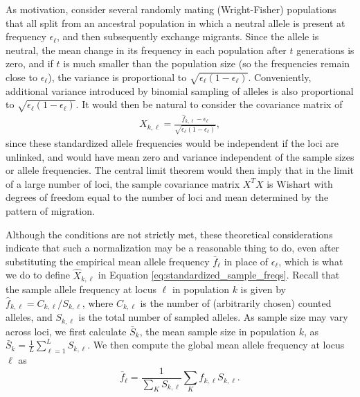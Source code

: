 \documentclass[10pt,letterpaper]{article}
\begin{document}
As motivation, consider several randomly mating (Wright-Fisher) populations
that all split from an ancestral population
in which a neutral allele is present at frequency $\epsilon_\ell$,
and then subsequently exchange migrants.
Since the allele is neutral, the mean change in its frequency in each population after $t$ generations is zero,
and if $t$ is much smaller than the population size (so the frequencies remain close to $\epsilon_\ell$), 
the variance is proportional to $\sqrt{\epsilon_\ell (1-\epsilon_\ell)}$.
Conveniently, additional variance introduced by binomial sampling of alleles
is also proportional to $\sqrt{\epsilon_\ell (1-\epsilon_\ell)}$.
It would then be natural to consider the covariance matrix of 
\begin{align}
  X_{k,\ell} = \frac{ \hat f_{k,\ell} - \epsilon_\ell }{ \sqrt{ \epsilon_\ell (1- \epsilon_\ell) } } ,
\end{align}
since these standardized allele frequencies would be independent if the loci are unlinked,
and would have mean zero and variance independent of the sample sizes or allele frequencies.
The central limit theorem would then imply that in the limit of a large number of loci, 
the sample covariance matrix $X^T X$ is Wishart with degrees of freedom equal to the number of loci
and mean determined by the pattern of migration.

Although the conditions are not strictly met, 
these theoretical considerations indicate that such a normalization may be a reasonable thing to do,
even after substituting the empirical mean allele frequency $\bar f_\ell$ in place of $\epsilon_\ell$,
which is what we do to define $\hat X_{k,\ell}$ in Equation \eqref{eq:standardized_sample_freqs}.
Recall that the sample allele frequency at locus $\ell$ in population $k$ is given by $\hat{f}_{k,\ell} = C_{k,\ell}/S_{k,\ell}$,  
where $C_{k,\ell}$ is the number of (arbitrarily chosen) counted alleles,
and $S_{k,\ell}$ is the total number of sampled alleles.
As sample size may vary across loci, we first calculate $\bar{S}_k$, 
the mean sample size in population $k$, 
as $\bar{S}_k = \frac{1}{L}\sum_{\ell=1}^L S_{k,\ell}$.  
We then compute the global mean allele frequency at locus $\ell$ as
\begin{equation}
\label{eq:sample_mean_freq}
\bar{f}_{\ell} = \frac{1}{\sum_K S_{k,\ell}} \sum_K \hat{f}_{k,\ell} S_{k,\ell} .
\end{equation}
\end{document}

